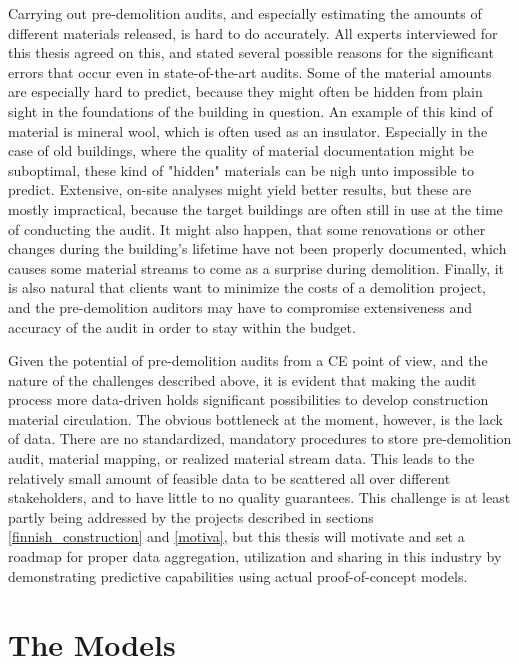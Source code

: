 \documentclass[english, 12pt, a4paper, sci, utf8, a-2b, online]{aaltothesis}
\begin{document}
Carrying out pre-demolition audits, and especially estimating the amounts of different materials released, is hard to do accurately. All experts interviewed for this thesis agreed on this,
and stated several possible reasons for the significant errors that occur even in state-of-the-art audits. Some of the material amounts are especially hard to predict, because they might
often be hidden from plain sight in the foundations of the building in question. An example of this kind of material is mineral wool, which is often used as an insulator. Especially in the case of old
buildings, where the quality of material documentation might be suboptimal, these kind of "hidden" materials can be nigh unto impossible to predict. Extensive, on-site analyses might yield better
results, but these are mostly impractical, because the target buildings are often still in use at the time of conducting the audit. It might also happen, that some renovations or
other changes during the building's lifetime have not been properly documented, which causes some material streams to come as a surprise during demolition. Finally, it is also natural that clients
want to minimize the costs of a demolition project, and the pre-demolition auditors may have to compromise extensiveness and accuracy of the audit in order to stay within the budget.

Given the potential of pre-demolition audits from a CE point of view, and the nature of the challenges described above, it is evident that making the audit process more data-driven holds significant
possibilities to develop construction material circulation. The obvious bottleneck at the moment, however, is the lack of data. There are no standardized, mandatory procedures to store pre-demolition
audit, material mapping, or realized material stream data. This leads to the relatively small amount of feasible data to be scattered all over different stakeholders, and to have little to
no quality guarantees. This challenge is at least partly being addressed by the projects described in sections \ref{finnish_construction} and \ref{motiva}, but this thesis will motivate and set a
roadmap for proper data aggregation, utilization and sharing in this industry by demonstrating predictive capabilities using actual proof-of-concept models.

\clearpage

\section{The Models} \label{models}
\end{document}
